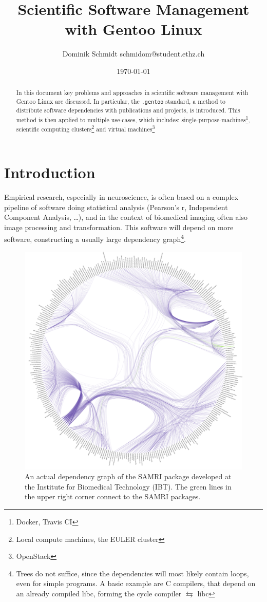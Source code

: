 \documentclass[11pt]{scrartcl}
\author{Dominik Schmidt \textsf{schmidom@student.ethz.ch}}
\title{Scientific Software Management with Gentoo Linux}
\date{\today}
\newcommand{\dg}[1]{\texttt{#1}}
\begin{document}
	\maketitle
	\begin{abstract}
		In this document key problems and approaches in scientific
		software management with Gentoo Linux are discussed.
		In particular, the \dg{.gentoo} standard, a method to distribute software dependencies with publications and projects, is introduced.
		This method is then applied to multiple use-cases, which includes:
		single-purpose-machines\footnote{Docker, Travis CI},
		scientific computing clusters\footnote{Local compute machines, the EULER cluster}
		and virtual machines\footnote{OpenStack}
	\end{abstract}
	\section{Introduction}
		Empirical research, especially in neuroscience, is often based on a complex pipeline of software doing statistical analysis (Pearson's r, Independent Component Analysis, \ldots), and in the context of biomedical imaging often also image processing and transformation.
		This software will depend on more software, constructing a usually large dependency graph\footnote{Trees do not suffice, since the dependencies will most likely contain loops, even for simple programs. A basic example are C compilers, that depend on an already compiled libc, forming the cycle compiler $\leftrightarrows$ libc}.
		
		\begin{figure}[H]
			\centering
			\includegraphics[width=0.75\linewidth]{graph/Real_Dependencygraph/RealDepgraph2.png}
			\caption{An actual dependency graph of the SAMRI package developed at the Institute for Biomedical Technology (IBT). The green lines in the upper right corner connect to the SAMRI packages.}
		\end{figure}
		
\end{document}
